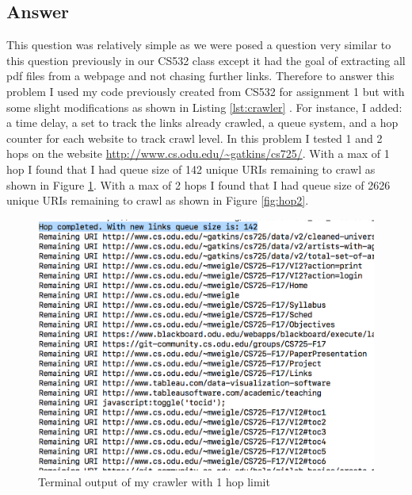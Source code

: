 \documentclass[letterpaper,11pt]{article}
\newcommand*{\srcPath}{../src}%
\begin{document}
\subsection*{Answer}

This question was relatively simple as we were posed a question very similar to this question previously in our CS532 class except it had the goal of extracting all pdf files from a webpage and not chasing further links.
Therefore to answer this problem I used my code previously created from CS532 for assignment 1 but with some slight modifications as shown in Listing \ref{lst:crawler} \cite{cs532}.
For instance, I added: a time delay, a set to track the links already crawled, a queue system, and a hop counter for each website to track crawl level.
In this problem I tested 1 and 2 hops on the website \url{http://www.cs.odu.edu/~gatkins/cs725/}. 
With a max of 1 hop I found that I had queue size of 142 unique URIs remaining to crawl as shown in Figure \ref{fig:hop1}.
With a max of 2 hops I found that I had queue size of 2626 unique URIs remaining to crawl as shown in Figure \ref{fig:hop2}.

 

\clearpage

\begin{figure}[h]
\centering
\includegraphics[scale=0.43]{hop1.png}
\caption{Terminal output of my crawler with 1 hop limit}
\label{fig:hop1}
\end{figure}
\end{document}
